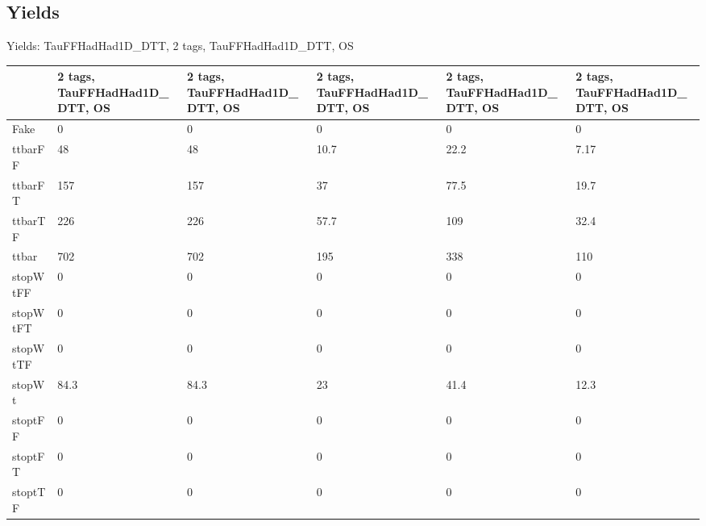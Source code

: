 
\subsection{Yields}

\begin{frame}{Yields: TauFFHadHad1D\_DTT, 2 tags, TauFFHadHad1D\_DTT, OS}
\begin{center}
  \begin{tabular}{l| >{\centering\let\newline\\\arraybackslash\hspace{0pt}}m{1.4cm}| >{\centering\let\newline\\\arraybackslash\hspace{0pt}}m{1.4cm}| >{\centering\let\newline\\\arraybackslash\hspace{0pt}}m{1.4cm}| >{\centering\let\newline\\\arraybackslash\hspace{0pt}}m{1.4cm}| >{\centering\let\newline\\\arraybackslash\hspace{0pt}}m{1.4cm}}
    & 2 tags, TauFFHadHad1D\_DTT, OS & 2 tags, TauFFHadHad1D\_DTT, OS & 2 tags, TauFFHadHad1D\_DTT, OS & 2 tags, TauFFHadHad1D\_DTT, OS & 2 tags, TauFFHadHad1D\_DTT, OS \\
 \hline \hline
    Fake& 0 & 0 & 0 & 0 & 0 \\
 \hline
    ttbarFF& 48 & 48 & 10.7 & 22.2 & 7.17 \\
 \hline
    ttbarFT& 157 & 157 & 37 & 77.5 & 19.7 \\
 \hline
    ttbarTF& 226 & 226 & 57.7 & 109 & 32.4 \\
 \hline
    ttbar& 702 & 702 & 195 & 338 & 110 \\
 \hline
    stopWtFF& 0 & 0 & 0 & 0 & 0 \\
 \hline
    stopWtFT& 0 & 0 & 0 & 0 & 0 \\
 \hline
    stopWtTF& 0 & 0 & 0 & 0 & 0 \\
 \hline
    stopWt& 84.3 & 84.3 & 23 & 41.4 & 12.3 \\
 \hline
    stoptFF& 0 & 0 & 0 & 0 & 0 \\
 \hline
    stoptFT& 0 & 0 & 0 & 0 & 0 \\
 \hline
    stoptTF& 0 & 0 & 0 & 0 & 0 \\

\end{tabular}
\end{center}
\end{frame}
